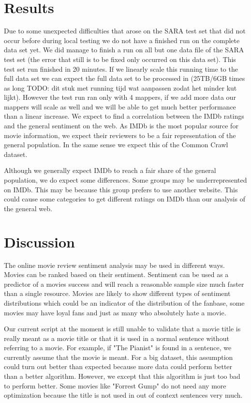 \documentclass{sig-alternate-br}
\begin{document}
\section{Results}
Due to some unexpected difficulties that arose on the SARA test set that did not occur before during local testing we do not have a finished run on the complete data set yet. We did manage to finish a run on all but one data file of the SARA test set (the error that still is to be fixed only occurred on this data set). This test set run finished in 20 minutes. If we linearly scale this running time to the full data set we can expect the full data set to be processed in (25TB/6GB times as long TODO: dit stuk met running tijd wat aanpassen zodat het minder kut lijkt). However the test run ran only with 4 mappers, if we add more data our mappers will scale as well and we will be able to get much better performance than a linear increase. We expect to find a correlation between the IMDb ratings and the general sentiment on the web. As IMDb is the most popular source for movie information, we expect their reviewers to be a fair representation of the general population. In the same sense we expect this of the Common Crawl dataset.



Although we generally expect IMDb to reach a fair share of the general population, we do expect some differences. Some groups may be underrepresented on IMDb. This may be because this group prefers to use another website. This could cause some categories to get different ratings on IMDb than our analysis of the general web.



\section{Discussion}
The online movie review sentiment analysis may be used in different ways. Movies can be ranked based on their sentiment. Sentiment can be used as a predictor of a movies success and will reach a reasonable sample size much faster than a single resource. 
Movies are likely to show different types of sentiment distributions which could be an indicator of the distribution of the fanbase, some movies may have loyal fans and just as many who absolutely hate a movie. 

Our current script at the moment is still unable to validate that a movie title is really meant as a movie title or that it is used in a normal sentence without referring to a movie. For example, if "The Pianist" is found in a sentence, we currently assume that the movie is meant. For a big dataset, this assumption could turn out better than expected because more data could perform better than a better algorithm. However, we except that this algorithm is just too bad to perform better. Some movies like "Forrest Gump" do not need any more optimization because the title is not used in out of context sentences very much.
\end{document}
